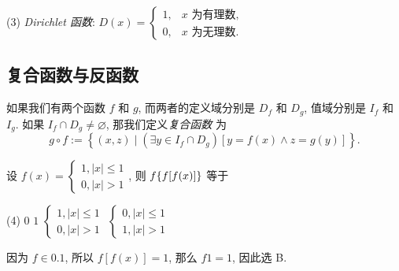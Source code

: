 (3) \textit{Dirichlet 函数}: $ D(x)=\begin{cases}
    1, & x \text { 为有理数, } \\ 0, & x \text { 为无理数. }
\end{cases}$

\subsection{复合函数与反函数}

\begin{definition}[复合函数]
    如果我们有两个函数 $ f $ 和 $ g $, 而两者的定义域分别是 $ D_{f} $ 和 $ D_{g} $, 
    值域分别是 $ I_{f} $ 和 $ I_{g} $. 如果 $ I_{f} \cap D_{g} \neq \varnothing $, 
    那我们定义\textit{复合函数} 为 $$ g \circ f:=\left\{(x, z) \mid\left(\exists y \in I_{f} \cap D_{g}\right)[y=f(x) \wedge z=g(y)]\right\} .$$
\end{definition}

\begin{example}[2001 数二]
    设 $f(x)=\begin{cases}
            1,|x|\leqslant 1 \\0,|x|>1
        \end{cases}$, 则 $f\qty{f[f(x)]}$ 等于
    \begin{tasks}(4)
        \task $0$
        \task $1$
        \task $\begin{cases}
                1,|x|\leqslant 1 \\0,|x|>1
            \end{cases}$
        \task $\begin{cases}
                0,|x|\leqslant 1 \\1,|x|>1
            \end{cases}$
    \end{tasks}
\end{example}
\begin{solution}
    因为 $f\in\qty{0,1}$, 所以 $f[f(x)]=1$, 那么 $f\qty{1}=1$, 因此选 B.
\end{solution}

